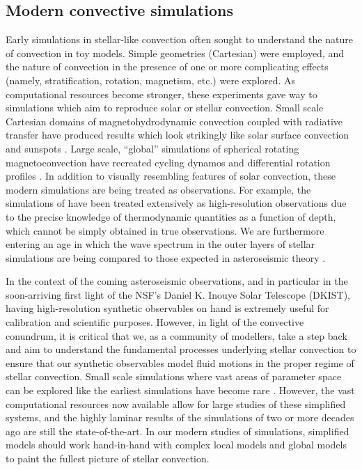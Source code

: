 \documentclass[aasms,11pt]{article}
\begin{document}
\subsection{Modern convective simulations}
Early simulations in stellar-like convection \citep{graham1975, hurlburt&all1984, cattaneo&all1991, brummell&all1996, brummell&all1998} often sought to understand the nature of convection in toy models.
Simple geometries (Cartesian) were employed, and the nature of convection in the presence of one or more complicating effects (namely, stratification, rotation, magnetism, etc.) were explored.
As computational resources become stronger, these experiments gave way to simulations which aim to reproduce solar or stellar convection.
Small scale Cartesian domains of magnetohydrodynamic convection coupled with radiative transfer have produced results which look strikingly like solar surface convection and sunspots \citep{stein&nordlund1998, rempel&all2009, stein&nordlund2012, rempel2014}.
Large scale, ``global'' simulations of spherical rotating magnetoconvection have recreated cycling dynamos and differential rotation profiles \citep{brown&all2010, brown&all2011, guerrero&all2016, brun&all2017, strugarek&all2018}.
In addition to visually resembling features of solar convection, these modern simulations are being treated as observations.
For example, the simulations of \citet{rempel2014} have been treated extensively as high-resolution observations \citep[see e.g.,][and others]{vankooten&cranmer2017, shchukina&trujillo2019} due to the precise knowledge of thermodynamic quantities as a function of depth, which cannot be simply obtained in true observations.
We are furthermore entering an age in which the wave spectrum in the outer layers of stellar simulations are being compared to those expected in asteroseismic theory \citep{edelmann&all2019}.

In the context of the coming asteroseismic observations, and in particular in the soon-arriving first light of the NSF's Daniel K. Inouye Solar Telescope (DKIST), having high-resolution synthetic observables on hand is extremely useful for calibration and scientific purposes.
However, in light of the convective conundrum, it is critical that we, as a community of modellers, take a step back and aim to understand the fundamental processes underlying stellar convection to ensure that our synthetic observables model fluid motions in the proper regime of stellar convection.
Small scale simulations where vast areas of parameter space can be explored like the earliest simulations have become rare \citep{wood&brummell2012, wood&brummell2018}.
However, the vast computational resources now available allow for large studies of these simplified systems, and the highly laminar results of the simulations of two or more decades ago are still the state-of-the-art.
In our modern studies of simulations, simplified models \citep{brummell&all1998} should work hand-in-hand with complex local models \citep{rempel2014} and global models \citep{strugarek&all2018} to paint the fullest picture of stellar convection.
\end{document}
